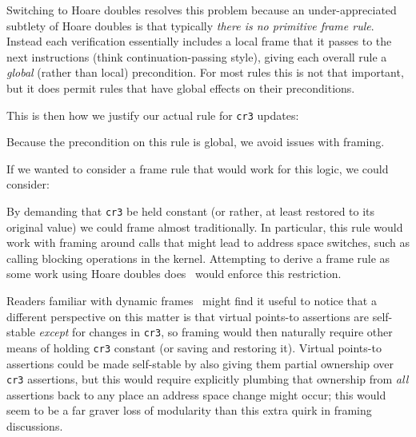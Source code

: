 Switching to Hoare doubles resolves this problem because an under-appreciated subtlety of Hoare doubles 
is that typically \emph{there is no primitive frame rule}. 
Instead each verification essentially includes a local frame that it passes to the next instructions
(think continuation-passing style), giving each overall rule a \emph{global} (rather than local) precondition. For most rules this is not that important, but it does permit rules that have global effects on their preconditions.

This is then how we justify our actual rule for \lstinline|cr3| updates:
\begin{mathpar}
\end{mathpar}
Because the precondition on this rule is global, we avoid issues with framing.

If we wanted to consider a frame rule that would work for this logic, we could consider:
\begin{mathpar}
\end{mathpar}
By demanding that \lstinline|cr3| be held constant (or rather, at least restored to its original value) we could frame almost traditionally. In particular, this rule would work with framing around calls that might lead to address space switches, such as calling blocking operations in the kernel.
Attempting to derive a frame rule as some work using Hoare doubles does~\cite{Chlipala2013Bedrock}
would enforce this restriction.

Readers familiar with dynamic frames~\cite{parkinson2011relationship} might find it useful to notice that a different perspective on this matter is that virtual points-to assertions are self-stable \emph{except} for changes in \lstinline|cr3|, so framing would then naturally require other means of holding \lstinline|cr3| constant (or saving and restoring it).
Virtual points-to assertions could be made self-stable by also giving them partial ownership over \lstinline|cr3| assertions, but this would require explicitly plumbing that ownership from \emph{all} assertions back to any place an address space change might occur; this would seem to be a far graver loss of modularity than this extra quirk in framing discussions.


